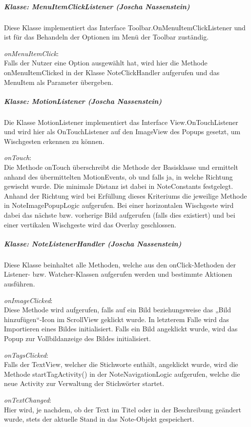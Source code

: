 \subparagraph*{Klasse: MenuItemClickListener (Joscha Nassenstein)}
Diese Klasse implementiert das Interface Toolbar.OnMenuItemClickListener und ist für das Behandeln der Optionen im Menü der Toolbar zuständig.

\textit{onMenuItemClick}:\\
Falls der Nutzer eine Option ausgewählt hat, wird hier die Methode onMenuItemClicked in der Klasse NoteClickHandler aufgerufen und das MenuItem als Parameter übergeben.

\subparagraph*{Klasse: MotionListener (Joscha Nassenstein)}
Die Klasse MotionListener implementiert das Interface View.OnTouchListener und wird hier als OnTouchListener auf den ImageView des Popups gesetzt, um Wischgesten erkennen zu können.

\textit{onTouch}:\\
Die Methode onTouch überschreibt die Methode der Basisklasse und ermittelt anhand des übermittelten MotionEvents, ob und falls ja, in welche Richtung gewischt wurde. Die minimale Distanz ist dabei in NoteConstants festgelegt. Anhand der Richtung wird bei Erfüllung dieses Kriteriums die jeweilige Methode in NoteImagePopupLogic aufgerufen. Bei einer horizontalen Wischgeste wird dabei das nächste bzw. vorherige Bild aufgerufen (falls dies existiert) und bei einer vertikalen Wischgeste wird das Overlay geschlossen.

\subparagraph*{Klasse: NoteListenerHandler (Joscha Nassenstein)}
Diese Klasse beinhaltet alle Methoden, welche aus den onClick-Methoden der Listener- bzw. Watcher-Klassen aufgerufen werden und bestimmte Aktionen ausführen.

\textit{onImageClicked}:\\
Diese Methode wird aufgerufen, falls auf ein Bild beziehungsweise das „Bild hinzufügen“-Icon im ScrollView geklickt wurde. In letzterem Falle wird das Importieren eines Bildes initialisiert. Falls ein Bild angeklickt wurde, wird das Popup zur Vollbildanzeige des Bildes initialisiert.

\textit{onTagsClicked}:\\
Falls der TextView, welcher die Stichworte enthält, angeklickt wurde, wird die Methode startTagActivity() in der NoteNavigationLogic aufgerufen, welche die neue Activity zur Verwaltung der Stichwörter startet.

\textit{onTextChanged}:\\
Hier wird, je nachdem, ob der Text im Titel oder in der Beschreibung geändert wurde, stets der aktuelle Stand in das Note-Objekt gespeichert.

